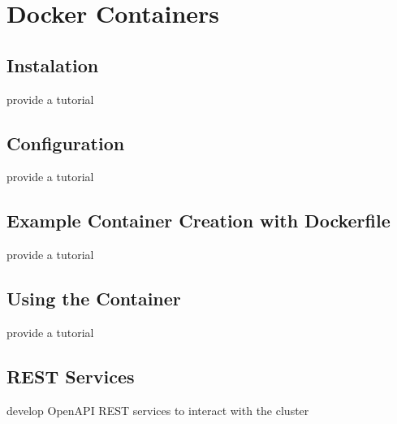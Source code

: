 \chapter{Docker Containers}

\section{Instalation}

\begin{exercise}
provide a tutorial 
\end{exercise}

\section{Configuration}

\begin{exercise}
provide a tutorial 
\end{exercise}

\section{Example Container Creation with Dockerfile}

\begin{exercise}
provide a tutorial 
\end{exercise}

\section{Using the Container}

\begin{exercise}
provide a tutorial 
\end{exercise}

\section{REST Services}

\begin{exercise}
develop OpenAPI REST services to interact with the cluster
\end{exercise}

